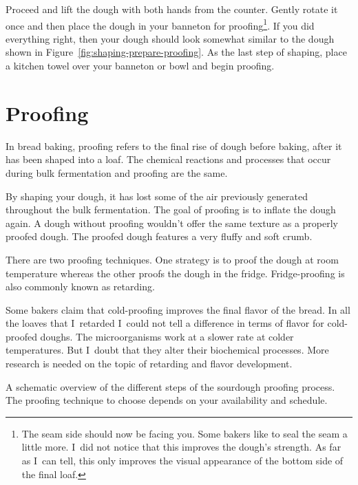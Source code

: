 Proceed and lift the dough with both hands from the counter.  Gently rotate it
once and then place the dough in your banneton for proofing\footnote{The seam
    side should now be facing you.  Some bakers like to seal the seam a little
    more. I~did not notice that this improves the dough's strength. As far as
    I~can tell, this only improves the visual appearance of the bottom side of
    the final loaf.}.
If you did everything right, then your dough should look somewhat similar to
the dough shown in Figure~\ref{fig:shaping-prepare-proofing}.  As the last
step of shaping, place a kitchen towel over your banneton or bowl and begin
proofing.

\section{Proofing}

In bread baking, proofing refers to the final rise of dough before baking,
after it has been shaped into a loaf. The chemical reactions and processes
that occur during bulk fermentation and proofing are the same.

By shaping your dough, it has lost some of the air previously generated
throughout the bulk fermentation. The goal of proofing is to inflate
the dough again. A dough without proofing wouldn't offer the same texture
as a properly proofed dough. The proofed dough features a very fluffy
and soft crumb.

There are two proofing techniques. One strategy is to proof the dough
at room temperature whereas the other proofs the dough in the fridge.
Fridge-proofing is also commonly known as retarding.

Some bakers claim that cold-proofing improves the final flavor of the bread.
In all the loaves that I~retarded I~could not tell a difference
in terms of flavor for cold-proofed doughs. The microorganisms work
at a slower rate at colder temperatures. But I~doubt that they alter
their biochemical processes. More research is needed on the topic
of retarding and flavor development.

\begin{flowchart}[!htb]
\centering
  
  \caption[Sourdough proofing process]{A schematic overview of the different steps of
      the sourdough proofing process. The proofing technique to choose depends
      on your availability and schedule.}%
  \label{fig:proofing-process}
\end{flowchart}

